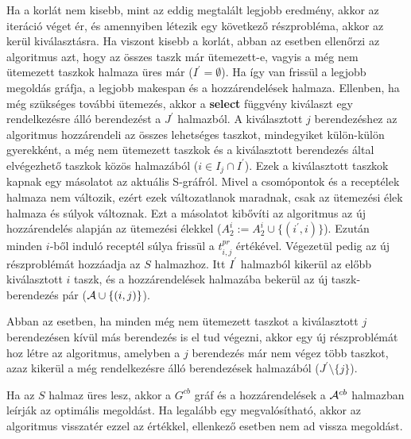 Ha a korlát nem kisebb, mint az eddig megtalált legjobb eredmény, akkor az iteráció véget ér, és amennyiben létezik egy következő részprobléma, akkor az kerül kiválasztásra. Ha viszont kisebb a korlát, abban az esetben ellenőrzi az algoritmus azt, hogy az összes taszk már ütemezett-e, vagyis a még nem ütemezett taszkok halmaza üres már ($I^{'}=\emptyset$). Ha így van frissül a legjobb megoldás gráfja, a legjobb makespan és a hozzárendelések halmaza. Ellenben, ha még szükséges további ütemezés, akkor a  \textbf{select} függvény kiválaszt egy rendelkezésre álló berendezést a $J^{'}$ halmazból. A kiválasztott $j$ berendezéshez az algoritmus hozzárendeli az összes lehetséges taszkot, mindegyiket külön-külön gyerekként, a még nem ütemezett taszkok és a kiválasztott berendezés által elvégezhető taszkok közös halmazából ($i \in I_{j} \cap I^{'}$). Ezek a kiválasztott taszkok kapnak egy másolatot az aktuális S-gráfról. Mivel a csomópontok és a receptélek halmaza nem változik, ezért ezek változatlanok maradnak, csak az ütemezési élek halmaza és súlyok változnak. Ezt a másolatot kibővíti az algoritmus az új hozzárendelés alapján az ütemezési élekkel ($A^{i}_{2}:= A^{i}_{2} \cup \{(i^{'},i)\}$). Ezután minden $i$-ből induló receptél súlya frissül a $t^{pr}_{i,j}$ értékével. Végezetül pedig az új részproblémát hozzáadja az $S$ halmazhoz. Itt $I^{'}$ halmazból kikerül az előbb kiválasztott $i$ taszk, és a hozzárendelések halmazába bekerül az új taszk-berendezés pár (${\cal A}\cup\{(i,j)\}$).

Abban az esetben, ha minden még nem ütemezett taszkot a kiválasztott $j$ berendezésen kívül más berendezés is el tud végezni, akkor egy új részproblémát hoz létre az algoritmus, amelyben a $j$ berendezés már nem végez több taszkot, azaz kikerül a még rendelkezésre álló berendezések halmazából ($J^{'}\setminus\{j\}$).

Ha az $S$ halmaz üres lesz, akkor a $G^{cb}$ gráf és a hozzárendelések a ${\cal A}^{cb}$ halmazban leírják az optimális megoldást. Ha legalább egy megvalósítható, akkor az algoritmus visszatér ezzel az értékkel, ellenkező esetben nem ad vissza megoldást.

